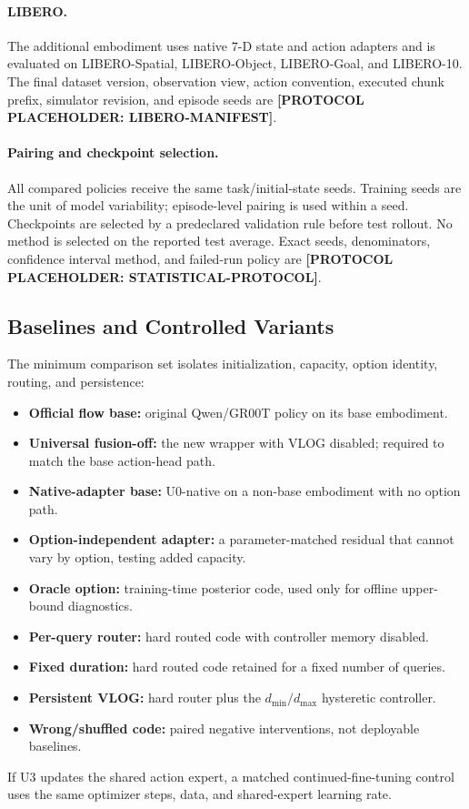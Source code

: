 \paragraph{LIBERO.}
The additional embodiment uses native \(7\)-D state and action adapters and is
evaluated on LIBERO-Spatial, LIBERO-Object, LIBERO-Goal, and LIBERO-10.
The final dataset version, observation view, action convention, executed chunk
prefix, simulator revision, and episode seeds are
\textbf{[PROTOCOL PLACEHOLDER: LIBERO-MANIFEST]}.

\paragraph{Pairing and checkpoint selection.}
All compared policies receive the same task/initial-state seeds.  Training seeds
are the unit of model variability; episode-level pairing is used within a seed.
Checkpoints are selected by a predeclared validation rule before test rollout.
No method is selected on the reported test average.  Exact seeds, denominators,
confidence interval method, and failed-run policy are
\textbf{[PROTOCOL PLACEHOLDER: STATISTICAL-PROTOCOL]}.

\subsection{Baselines and Controlled Variants}

The minimum comparison set isolates initialization, capacity, option identity,
routing, and persistence:
\begin{itemize}
    \item \textbf{Official flow base:} original Qwen/GR00T policy on its base
    embodiment.
    \item \textbf{Universal fusion-off:} the new wrapper with VLOG disabled;
    required to match the base action-head path.
    \item \textbf{Native-adapter base:} U0-native on a non-base embodiment with
    no option path.
    \item \textbf{Option-independent adapter:} a parameter-matched residual that
    cannot vary by option, testing added capacity.
    \item \textbf{Oracle option:} training-time posterior code, used only for
    offline upper-bound diagnostics.
    \item \textbf{Per-query router:} hard routed code with controller memory
    disabled.
    \item \textbf{Fixed duration:} hard routed code retained for a fixed number
    of queries.
    \item \textbf{Persistent VLOG:} hard router plus the \(d_{\min}/d_{\max}\)
    hysteretic controller.
    \item \textbf{Wrong/shuffled code:} paired negative interventions, not
    deployable baselines.
\end{itemize}
If U3 updates the shared action expert, a matched continued-fine-tuning control
uses the same optimizer steps, data, and shared-expert learning rate.

